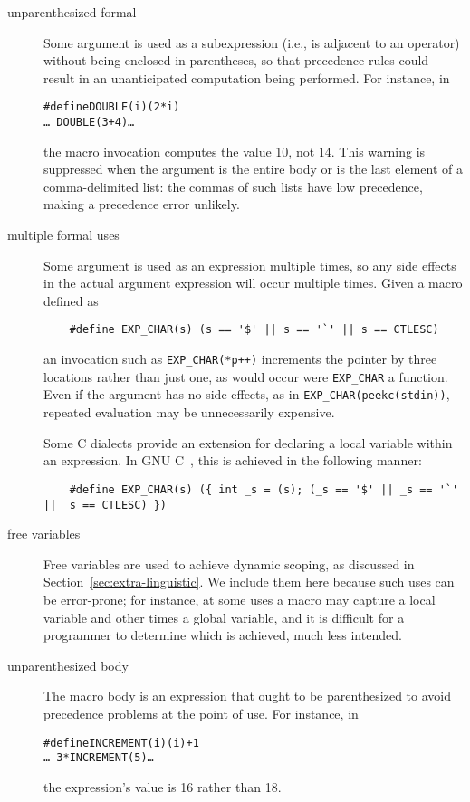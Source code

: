 \documentclass[10pt]{article}
\begin{document}
\begin{description}
\item[unparenthesized formal]
        Some argument is used as a subexpression (i.e., is adjacent to an
        operator) without being enclosed in parentheses, so that precedence
        rules could result in an unanticipated computation being performed.
        For instance, in
\begin{alltt}
    #define DOUBLE(i) (2*i)
    \ldots\ DOUBLE(3+4) \ldots
\end{alltt}
        the macro invocation computes the value 10, not 14.
        This warning is suppressed when the argument is the entire body
        or is the last element of a comma-delimited list:  the commas of
        such lists have low precedence, making a precedence error unlikely.

\item[multiple formal uses]
  Some argument is used as an expression multiple times, so any side
  effects in the actual argument expression will occur multiple times.
  Given a macro defined as
\begin{verbatim}
    #define EXP_CHAR(s) (s == '$' || s == '`' || s == CTLESC)
\end{verbatim}
  an invocation such as {\tt \verb|EXP_CHAR|(*p++)} increments the pointer
  by three locations rather than just one, as would occur
  were \verb|EXP_CHAR| a function.  Even if the argument has no side
  effects, as in {\tt \verb|EXP_CHAR|(peekc(stdin))}, repeated evaluation may be
  unnecessarily expensive.
        
  Some C dialects provide an extension for declaring a local variable
  within an expression.  In GNU C~\cite{GCC}, this is achieved in the
  following manner:
\begin{verbatim}
    #define EXP_CHAR(s) ({ int _s = (s); (_s == '$' || _s == '`' || _s == CTLESC) })
\end{verbatim}

\item[free variables]
  Free variables are used to achieve dynamic scoping, as discussed in
  Section~\ref{sec:extra-linguistic}.  We include them here because such
  uses can be error-prone; for instance, at some uses a macro may capture a
  local variable and other times a global variable, and it is difficult for
  a programmer to determine which is achieved, much less intended.

\item[unparenthesized body]
        The macro body is an expression that ought to be parenthesized to
        avoid precedence problems at the point of use.  For instance, in
\begin{alltt}
    #define INCREMENT(i) (i)+1
    \ldots\ 3*INCREMENT(5) \ldots
\end{alltt}
        the expression's value is 16 rather than 18.
        

\end{description}
\end{document}
